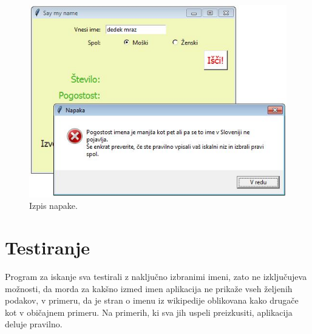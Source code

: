 \documentclass[a4paper, 12pt]{article}
\begin{document}
\begin{figure}[h]
\centering
\includegraphics[scale=0.8] {napaka.jpg}
\caption{Izpis napake.}
\end{figure}

\section{Testiranje}
Program za iskanje sva testirali z naključno izbranimi imeni, zato ne izključujeva možnosti, da morda za kakšno izmed imen aplikacija ne prikaže vseh željenih podakov, v primeru, da je stran o imenu iz wikipedije oblikovana kako drugače kot v običajnem primeru. Na primerih, ki sva jih uspeli preizkusiti, aplikacija deluje pravilno.
\end{document}
